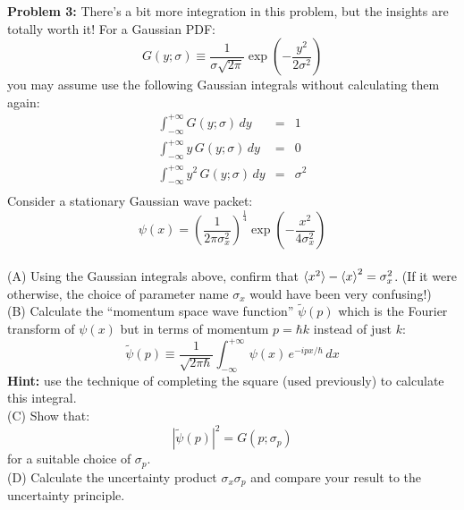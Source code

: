 \documentclass[12pt]{article}
\begin{document}
\noindent
{\bf Problem 3:}  There's a bit more integration in this problem, but the insights are totally worth it!  For a Gaussian PDF:
$$G(y;\sigma) \equiv \frac{1}{\sigma \sqrt{2\pi}}\exp\left(-\frac{y^2}{2\sigma^2}\right)$$
you may assume use the following Gaussian integrals without calculating them again:
\begin{eqnarray*}
\int_{-\infty}^{+\infty} G(y;\sigma) \, dy       &=& 1\\
\int_{-\infty}^{+\infty} y \, G(y;\sigma) \, dy     &=& 0\\
\int_{-\infty}^{+\infty} y^2 \, G(y; \sigma) \, dy  &=& \sigma^2\\
\end{eqnarray*}
Consider a stationary Gaussian wave packet:\\
$$\psi(x) = \left( \frac{1}{2\pi \sigma_x^2}\right)^{\frac{1}{4}} \exp\left(-\frac{x^2}{4\sigma_x^2}\right)$$
\\[5pt]
\noindent
(A) Using the Gaussian integrals above, confirm that $\braket{x^2} - \braket{x}^2 = \sigma_x^2$.  (If it were otherwise, the choice of parameter name $\sigma_x$ would have been very confusing!)\\[8pt]
(B) Calculate the ``momentum space wave function'' $\widetilde{\psi}(p)$ which is the Fourier transform of $\psi(x)$ but in terms of momentum $p=\hbar k$ instead of just $k$:
$$\widetilde{\psi}(p) \equiv \frac{1}{\sqrt{2 \pi \hbar}} \int_{-\infty}^{+\infty} \, \psi(x) \, e^{-ipx/\hbar} \, dx$$
{\bf Hint:} use the technique of completing the square (used previously) to calculate this integral.\\[8pt]
(C) Show that:
$$|\widetilde{\psi}(p)|^2 = G(p;\sigma_p)$$
for a suitable choice of $\sigma_p$.\\[8pt]
(D) Calculate the uncertainty product $\sigma_x \sigma_p$ and compare your result to the uncertainty principle. 
\end{document}
